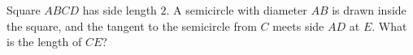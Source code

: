Square $ABCD$ has side length $2$. A semicircle with diameter $AB$ is drawn inside the square, and the tangent to the semicircle from $C$ meets side $AD$ at $E$. What is the length of $CE$?
